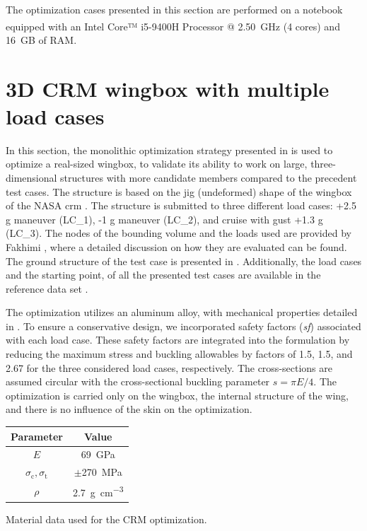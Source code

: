 The optimization cases presented in this section are performed on a notebook equipped with an Intel\textsuperscript{\textregistered} Core™ i5-9400H Processor @ \qty{2.50}{GHz} (4 cores) and \qty{16}{GB} of RAM. 

\section{3D CRM wingbox with multiple load cases}
In this section, the monolithic optimization strategy presented in  is used to optimize a real-sized wingbox, to validate its ability to work on large, three-dimensional structures with more candidate members compared to the precedent test cases. The structure is based on the jig (undeformed) shape of the wingbox of the NASA \gls{crm} . The structure is submitted to three different load cases: +2.5 g maneuver (LC\_1), -1 g maneuver (LC\_2), and cruise with gust +1.3 g (LC\_3). The nodes of the bounding volume and the loads used are provided by Fakhimi \etal {}, where a detailed discussion on how they are evaluated can be found. The ground structure of the test case is presented in . Additionally, the load cases and the starting point, of all the presented test cases are available in the reference data set .

The optimization utilizes an aluminum alloy, with mechanical properties detailed in . To ensure a conservative design, we incorporated safety factors (\textit{sf}) associated with each load case. These safety factors are integrated into the formulation by reducing the maximum stress and buckling allowables by factors of 1.5, 1.5, and 2.67 for the three considered load cases, respectively. The cross-sections are assumed circular with the cross-sectional buckling parameter $s = \pi E/4$. The optimization is carried only on the wingbox, the internal structure of the wing, and there is no influence of the skin on the optimization.
\begin{margintable}
    \small
    \centering
    \begin{tabular}{cc}
    \toprule
    \textbf{Parameter}        & \textbf{Value} \\ \midrule
    $E$              & \qty{69}{GPa}     \\
    $\sigma_\text{c}, \sigma_\text{t}$ & $\pm $\qty{270}{MPa} \\
    $\rho$              & \qty{2.7}{\gram\per\cubic\centi\metre}   \\
    \bottomrule
    \end{tabular}
    \caption{Material data used for the CRM optimization.}
    \label{tab:07_CRM_mat}
\end{margintable}

